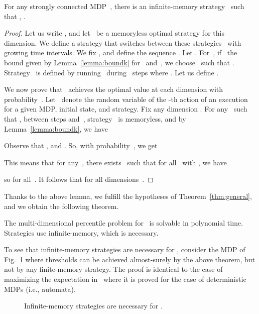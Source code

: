 \documentclass{llncs}
\begin{document}
\begin{lemma}
  For any strongly connected MDP~,  there is an infinite-memory strategy~ such that , .
\end{lemma}

\begin{proof}
  Let us write , and let~ be a memoryless 
  optimal strategy for this dimension.
  We define a strategy that switches between these strategies~ with growing time intervals. 
  We fix , and define the sequence .
  Let . For~, if~ the bound given by Lemma~\ref{lemma:boundk}
  for~ and~, we choose~ such that .
  Strategy~ is defined by running~ during~ steps where .
  Let us define .
  
  We now prove that~ achieves the optimal value at each dimension with probability~.
  Let~ denote the random variable of the -th action of an execution for a given MDP, initial state, and strategy.
  Fix any dimension . For any~ such that ,
  between steps  and~, strategy~ is memoryless, and by Lemma~\ref{lemma:boundk},
  we have
  
  Observe that , and .
  So, with probability~, we get
  
  This means that for any~, there exists~ such that for all~ with , we have
  
  so  for all~.
  It follows that  for all dimensions~.
\end{proof}

Thanks to the above lemma, we fulfill the hypotheses of Theorem~\ref{thm:general}, and we obtain the following theorem.

\begin{theorem}
\label{thm:mpsup}
  The multi-dimensional percentile problem for~
  is solvable in polynomial time. Strategies use infinite-memory, which is necessary.
\end{theorem}


To see that infinite-memory strategies are necessary for , consider the MDP of Fig.~\ref{fig:mpsup-memory} where thresholds  can be achieved almost-surely by the above theorem, but not by any finite-memory strategy. The proof is identical to the case of maximizing the expectation in~\cite[Lemma 7]{CDHR-fsttcs10} where it is proved for the case of deterministic MDPs (i.e., automata).

\begin{figure}[ht]
  \centering
  \caption{Infinite-memory strategies are necessary for .}
  \label{fig:mpsup-memory}
\end{figure}
\end{document}
